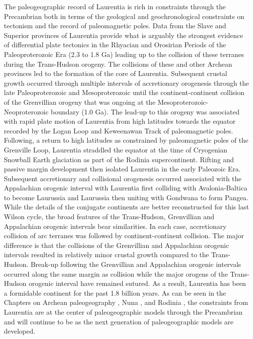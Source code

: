 \documentclass[twocolumn, switch]{article} %
\begin{document}
The paleogeographic record of Laurentia is rich in constraints through the Precambrian both in terms of the geological and geochronological constraints on tectonism and the record of paleomagnetic poles. Data from the Slave and Superior provinces of Laurentia provide what is arguably the strongest evidence of differential plate tectonics in the Rhyacian and Orosirian Periods of the Paleoproterozoic Era (2.3 to 1.8 Ga) leading up to the collision of these terranes during the Trans-Hudson orogeny. The collisions of these and other Archean provinces led to the formation of the core of Laurentia. Subsequent crustal growth occurred through multiple intervals of accretionary orogenesis through the late Paleoproterozoic and Mesoproterozoic until the continent-continent collision of the Grenvillian orogeny that was ongoing at the Mesoproterozoic-Neoproterozoic boundary (1.0 Ga). The lead-up to this orogeny was associated with rapid plate motion of Laurentia from high latitudes towards the equator recorded by the Logan Loop and Keweenawan Track of paleomagnetic poles. Following, a return to high latitudes as constrained by paleomagnetic poles of the Grenville Loop, Laurentia straddled the equator at the time of Cryogenian Snowball Earth glaciation as part of the Rodinia supercontinent. Rifting and passive margin development then isolated Laurentia in the early Paleozoic Era. Subsequent accretionary and collisional orogenesis occurred associated with the Appalachian orogenic interval with Laurentia first colliding with Avalonia-Baltica to become Laurussia and Laurussia then uniting with Gondwana to form Pangea. While the details of the conjugate continents are better reconstructed for this last Wilson cycle, the broad features of the Trans-Hudson, Grenvillian and Appalachian orogenic intervals bear similarities. In each case, accretionary collision of arc terranes was followed by continent-continent collision. The major difference is that the collisions of the Grenvillian and Appalachian orogenic intervals resulted in relatively minor crustal growth compared to the Trans-Hudson. Break-up following the Grenvillian and Appalachian orogenic intervals occurred along the same margin as collision while the major orogens of the Trans-Hudson orogenic interval have remained sutured. As a result, Laurentia has been a formidable continent for the past 1.8 billion years. As can be seen in the Chapters on Archean paleogeography \citep{Salminen2021b}, Nuna \citep{Elming2021a}, and Rodinia \citep{Evans2021b}, the constraints from Laurentia are at the center of paleogeographic models through the Precambrian and will continue to be as the next generation of paleogeographic models are developed.
\end{document}
